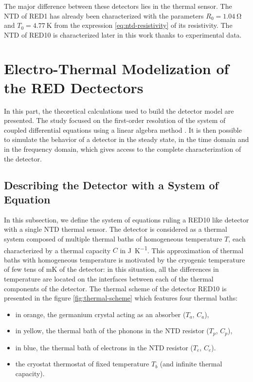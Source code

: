 The major difference between these detectors lies in the thermal sensor. The NTD of RED1 has already been characterized with the parameters $R_0 = \SI{1.04}{\ohm}$ and $T_0 = \SI{4.77}{\kelvin}$ from the expression \ref{eq:ntd-resistivity} of its resistivity.
The NTD of RED10 is characterized later in this work thanks to experimental data.

\section{Electro-Thermal Modelization of the RED Dectectors}
\label{sec:electro-thermal-model}

In this part, the theoretical calculations used to build the detector model are presented. The study focused on the first-order resolution of the system of coupled differential equations using a linear algebra method \cite{Figueroa:2006, Billard:2016apk}.
It is then possible to simulate the behavior of a detector in the steady state, in the time domain and in the frequency domain, which gives access to the complete characterization of the detector.

\subsection{Describing the Detector with a System of Equation}

In this subsection, we define the system of equations ruling a RED10 like detector with a single NTD thermal sensor. The detector is considered as a thermal system composed of multiple thermal baths of homogeneous temperature $T$, each characterized by a thermal capacity $C$ in \si{\joule\per\kelvin}.
This approximation of thermal baths with homogeneous temperature is motivated by the cryogenic temperature of few tens of \si{\milli\kelvin} of the detector: in this situation, all the differences in temperature are located on the interfaces between each of the thermal components of the detector.
The thermal scheme of the detector RED10 is presented in the figure \ref{fig:thermal-scheme} which features four thermal baths:
\begin{itemize}
\item in orange, the germanium crystal acting as an absorber ($T_a$, $C_a$),
\item in yellow, the thermal bath of the phonons in the NTD resistor ($T_p$, $C_p$),
\item in blue, the thermal bath of electrons in the NTD resistor ($T_e$, $C_e$).
\item the cryostat thermostat of fixed temperature $T_b$ (and infinite thermal capacity).
\end{itemize}

